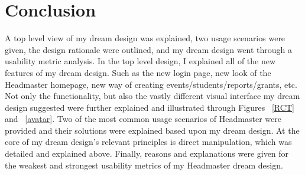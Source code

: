\documentclass[11pt]{article}
\begin{document}
\section{Conclusion}
A top level view of my dream design was explained, two usage scenarios were given, the design rationale were outlined, and my dream design went through a usability metric analysis. In the top level design, I explained all of the new features of my dream design. Such as the new login page, new look of the Headmaster homepage, new way of creating events/students/reports/grants, etc. Not only the functionality, but also the vastly different visual interface my dream design suggested were further explained and illustrated through Figures ~\ref{RCT} and ~\ref{avatar}. Two of the most common usage scenarios of Headmaster were provided and their solutions were explained based upon my dream design. At the core of my dream design's relevant principles is direct manipulation, which was detailed and explained above. Finally, reasons and explanations were given for the weakest and strongest usability metrics of my Headmaster dream design. 



\end{document}
